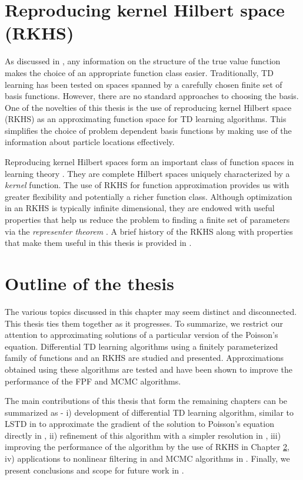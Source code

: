\section{Reproducing kernel Hilbert space (RKHS)}
As discussed in , any information on the structure of the true value function makes the choice of an appropriate function class easier. Traditionally, TD learning has been tested on spaces spanned by a carefully chosen finite set of basis functions. However, there are no standard approaches to choosing the basis. One of the novelties of this thesis is the use of reproducing kernel Hilbert space (RKHS) as an approximating function space for TD learning algorithms. This simplifies the choice of problem dependent basis functions by making use of the information about particle locations effectively. 
 
Reproducing kernel Hilbert spaces form an important class of function spaces in learning theory \cite{aro50, schsmo01}. They are complete Hilbert spaces uniquely characterized by a \textit{kernel} function. The use of RKHS for function approximation provides us with greater flexibility and potentially a richer function class. Although optimization in an RKHS is typically infinite dimensional, they are endowed with useful properties that help us reduce the problem to finding a finite set of parameters via the \textit{representer theorem} \cite{kimwah71, schhersmo01}. A brief history of the RKHS along with properties that make them useful in this thesis is provided in \Chapter{}. 
 

\section{Outline of the thesis}
The various topics discussed in this chapter may seem distinct and disconnected. This thesis ties them together as it progresses. To summarize, we restrict our attention to approximating solutions of a particular version of the Poisson's equation. Differential TD learning algorithms using a finitely parameterized family of functions and an RKHS are studied and presented. Approximations obtained using these algorithms are tested and have been shown to improve the performance of the FPF and MCMC algorithms. 

The main contributions of this thesis that form the remaining chapters can be summarized as - i) development of differential TD learning algorithm, similar to LSTD in \cite{ctcn} to approximate the gradient of the solution to Poisson's equation directly in , ii) refinement of this algorithm with a simpler resolution \cite{radmey18a} in \Chapter{}, iii) improving the performance of the algorithm by the use of RKHS in Chapter \ref{}, iv) applications to nonlinear filtering in \Chapter{} and MCMC algorithms in \Chapter{}. Finally, we present conclusions and scope for future work in \Chapter{}.  


